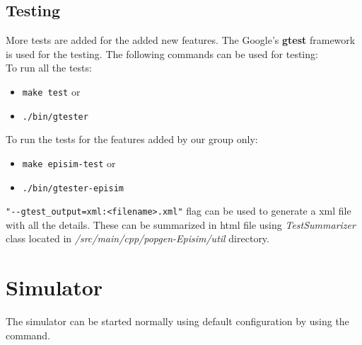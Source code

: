 \documentclass[a4paper]{article}
\begin{document}
\subsection{Testing}
More tests are added for the added new features. The Google's \textbf{gtest} framework is used for the testing. The following commands can be used for testing:\\
To run all the tests: 
\begin{itemize}
	\item \verb|make test| or
	\item \verb|./bin/gtester|
\end{itemize}
To run the tests for the features added by our group only: 
\begin{itemize}
	\item \verb|make episim-test| or
	\item \verb|./bin/gtester-episim|
\end{itemize}
\verb|"--gtest_output=xml:<filename>.xml"| flag can be used to generate a xml file with all the details. These can be summarized in html file using \textit{TestSummarizer} class located in \textit{/src/main/cpp/popgen-Episim/util} directory.

\section{Simulator}
The simulator can be started normally using default configuration by using the command.\\
\end{document}
